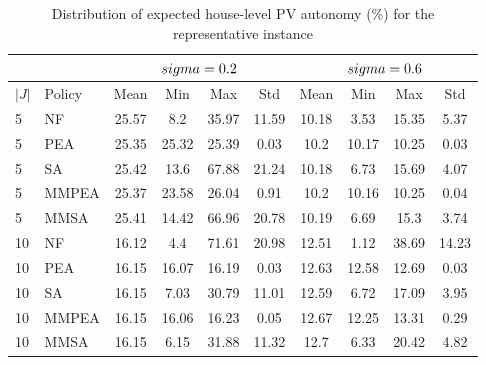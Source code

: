 \begin{table}[h]
\centering
\caption{Distribution of expected house-level PV autonomy (\%) for the representative instance}
\label{tab:coverage_PV_repr}
\begin{tabular}{llcccc|cccc}
\hline
 &  & \multicolumn{4}{c|}{$\\sigma = 0.2$} & \multicolumn{4}{c}{$\\sigma = 0.6$} \\
\hline
$|J|$ & Policy & Mean & Min & Max & Std & Mean & Min & Max & Std \\
\hline
5 & NF & 25.57 & 8.2 & 35.97 & 11.59 & 10.18 & 3.53 & 15.35 & 5.37 \\
5 & PEA & 25.35 & 25.32 & 25.39 & 0.03 & 10.2 & 10.17 & 10.25 & 0.03 \\
5 & SA & 25.42 & 13.6 & 67.88 & 21.24 & 10.18 & 6.73 & 15.69 & 4.07 \\
5 & MMPEA & 25.37 & 23.58 & 26.04 & 0.91 & 10.2 & 10.16 & 10.25 & 0.04 \\
5 & MMSA & 25.41 & 14.42 & 66.96 & 20.78 & 10.19 & 6.69 & 15.3 & 3.74 \\
\hline
10 & NF & 16.12 & 4.4 & 71.61 & 20.98 & 12.51 & 1.12 & 38.69 & 14.23 \\
10 & PEA & 16.15 & 16.07 & 16.19 & 0.03 & 12.63 & 12.58 & 12.69 & 0.03 \\
10 & SA & 16.15 & 7.03 & 30.79 & 11.01 & 12.59 & 6.72 & 17.09 & 3.95 \\
10 & MMPEA & 16.15 & 16.06 & 16.23 & 0.05 & 12.67 & 12.25 & 13.31 & 0.29 \\
10 & MMSA & 16.15 & 6.15 & 31.88 & 11.32 & 12.7 & 6.33 & 20.42 & 4.82 \\
\hline
\end{tabular}
\end{table}

